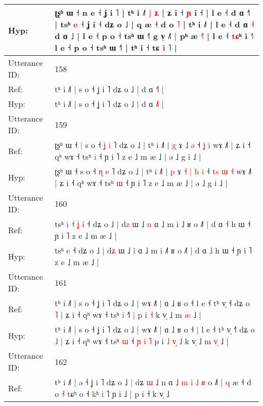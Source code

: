 \documentclass[10pt]{article}
\DeclareRobustCommand{\hl}[1]{{\textcolor{red}{#1}}}
\begin{document}
\begin{longtable}{ll}
 \\
Hyp: & ʈʂʰ ɯ ˧ n e ˧ ʝ i ˥ | tʰ i ˩˥\hl{ }\hl{|}\hl{ }\hl{ʑ} | ʑ i ˧ \hl{ɲ} i ˧ | l e ˧ d ɑ ˧˥ | tsʰ \hl{e} ˧ ʝ i ˧ dʑ o ˩ | q æ ˧ d o \hl{˥} | tʰ i ˩˥ | l e ˧ d ɑ \hl{˧} d ɑ ˩ | l e ˧ p o ˧ tsʰ ɯ ˧˥\hl{}\hl{} g v̩ ˩\hl{˥}\hl{ }\hl{|} pʰ æ \hl{˧}˥ | l e ˧ \hl{t}\hl{ɕ}ʰ i \hl{}\hl{˧}\hl{˥} l e ˧ p o ˧ tsʰ ɯ ˧˥ | tʰ i ˧ tɕ \hl{i} ˥ |
 \\
\midrule
Utterance ID: & 158 \\
Ref: & tʰ i ˩˥ | s o ˧ ʝ i ˥ dʑ o ˩ | d ɑ \hl{˧}˥ |
 \\
Hyp: & tʰ i ˩˥ | s o ˧ ʝ i ˥ dʑ o ˩ | d ɑ \hl{˩}˥ |
 \\
\midrule
Utterance ID: & 159 \\
Ref: & ʈʂʰ ɯ ˧\hl{ }\hl{|} s o ˧ \hl{ʝ} \hl{i} ˥ dʑ o ˩ | tʰ i ˩˥ | \hl{g} ɤ\hl{}\hl{}\hl{}\hl{} \hl{˩} \hl{ə} ˧\hl{}\hl{}\hl{} \hl{ʝ} \hl{i} wɤ ˩˥ | ʑ i ˧ qʰ wɤ ˧ tsʰ \hl{i} ˧ ɲ i ˥ z e ˩ m æ ˩ | ə ˩ g i ˩ |
 \\
Hyp: & ʈʂʰ ɯ ˧\hl{}\hl{} s o ˧ \hl{ɳ} \hl{e} ˥ dʑ o ˩ | tʰ i ˩˥ | \hl{p} ɤ\hl{ }\hl{˧}\hl{ }\hl{|} \hl{h} \hl{i} ˧\hl{ }\hl{t}\hl{s} \hl{ɯ} \hl{˧} wɤ ˩˥ | ʑ i ˧ qʰ wɤ ˧ tsʰ \hl{ɯ} ˧ ɲ i ˥ z e ˩ m æ ˩ | ə ˩ g i ˩ |
 \\
\midrule
Utterance ID: & 160 \\
Ref: & tsʰ\hl{ }\hl{i}\hl{ }\hl{˧}\hl{ }\hl{ʝ} \hl{i} ˧ dʑ o ˩ | d\hl{z} ɯ ˩ \hl{n} ɑ ˩ m i ˩\hl{} ʁ o ˩˥ | d ɑ \hl{˧} h ɯ ˧ ɲ i ˥ z e ˩ m æ ˩ |
 \\
Hyp: & tsʰ\hl{}\hl{}\hl{}\hl{}\hl{}\hl{} \hl{e} ˧ dʑ o ˩ | d\hl{ʑ} ɯ ˩ \hl{l} ɑ ˩ m i ˩\hl{˥} ʁ o ˩˥ | d ɑ \hl{˩} h ɯ ˧ ɲ i ˥ z e ˩ m æ ˩ |
 \\
\midrule
Utterance ID: & 161 \\
Ref: & tʰ i ˩˥ | s o ˧ ʝ i ˥ dʑ o ˩ | wɤ ˩˥ | ɑ ˩ ʁ o ˧\hl{}\hl{} l e ˧ tʰ v̩ ˧\hl{} dʑ o \hl{˥} | ʑ i ˧ qʰ wɤ ˧ tsʰ \hl{i} ˧\hl{}\hl{}\hl{}\hl{˥} \hl{|} p i\hl{}\hl{}\hl{}\hl{}\hl{} \hl{˧} k v̩ ˩ m \hl{}\hl{æ} ˩ |
 \\
Hyp: & tʰ i ˩˥ | s o ˧ ʝ i ˥ dʑ o ˩ | wɤ ˩˥ | ɑ ˩ ʁ o ˧\hl{ }\hl{|} l e ˧ tʰ v̩ ˧\hl{˥} dʑ o \hl{˩} | ʑ i ˧ qʰ wɤ ˧ tsʰ \hl{ɯ} ˧\hl{ }\hl{ɲ}\hl{ }\hl{i} \hl{˥} p i\hl{ }\hl{˩}\hl{ }\hl{v}\hl{̩} \hl{˩} k v̩ ˩ m \hl{v}\hl{̩} ˩ |
 \\
\midrule
Utterance ID: & 162 \\
Ref: & tʰ i ˩˥ | ə ˧ ʝ i ˥ dʑ o ˩\hl{ }\hl{|} dʑ \hl{ɯ} ˩ n ɑ ˩\hl{ }\hl{m}\hl{ }\hl{i} \hl{˩} \hl{ʁ} o ˩˥ | \hl{q} æ ˧ d o\hl{}\hl{} \hl{˧} tɕʰ o ˧ \hl{}\hl{k}ʰ \hl{i} ˥ ɲ i ˩ | p i ˧ k v̩ ˩\hl{}\hl{}
 \\

\end{longtable}
\end{document}
